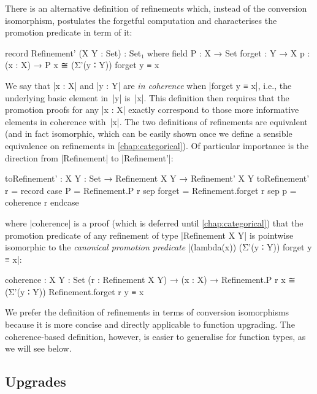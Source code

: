 There is an alternative definition of refinements which, instead of the conversion isomorphism, postulates the forgetful computation and characterises the promotion predicate in term of it:
\begin{code}
record Refinement' (X Y : Set) : Set₁ where
  field
    P       :  X → Set
    forget  :  Y → X
    p       :  (x : X) → P x ≅ (Σ'(y ∶ Y)) forget y ≡ x
\end{code}
We say that |x : X| and |y : Y| are \emph{in coherence} when |forget y ≡ x|, i.e., the underlying basic element in~|y| is~|x|.
This definition then requires that the promotion proofs for any |x : X| exactly correspond to those more informative elements in coherence with~|x|.
The two definitions of refinements are equivalent (and in fact isomorphic, which can be easily shown once we define a sensible equivalence on refinements in \autoref{chap:categorical}).
Of particular importance is the direction from |Refinement| to |Refinement'|:
\begin{code}
toRefinement' : {X Y : Set} → Refinement X Y → Refinement' X Y
toRefinement' r = record  case  P       =  Refinement.P r
                          sep   forget  =  Refinement.forget r
                          sep   p       =  coherence r endcase
\end{code}
where |coherence| is a proof (which is deferred until \autoref{chap:categorical}) that the promotion predicate of any refinement of type |Refinement X Y| is pointwise isomorphic to the \emph{canonical promotion predicate} |(lambda(x)) (Σ'(y ∶ Y)) forget y ≡ x|:
\begin{code}
coherence :
  {X Y : Set} (r : Refinement X Y) →
  (x : X) → Refinement.P r x ≅ (Σ'(y ∶ Y)) Refinement.forget r y ≡ x
\end{code}
We prefer the definition of refinements in terms of conversion isomorphisms because it is more concise and directly applicable to function upgrading.
The coherence-based definition, however, is easier to generalise for function types, as we will see below.


\subsection{Upgrades}
\label{sec:upgrades}

